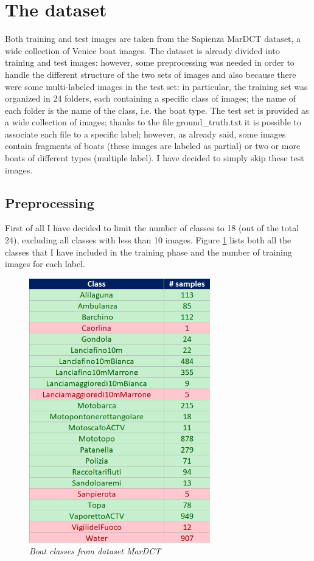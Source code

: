 \documentclass[12pt]{article}
\begin{document}
\section{The dataset}
\label{sec:dataset}
Both training and test images are taken from the Sapienza MarDCT dataset, a wide collection of Venice boat images. The dataset is already divided into training and test images: however, some preprocessing was needed in order to handle the different structure of the two sets of images and also because there were some multi-labeled images in the test set: in particular, the training set was organized in 24 folders, each containing a specific class of images; the name of each folder is the name of the class, i.e. the boat type. The test set is provided as a wide collection of images; thanks to the file ground\_truth.txt it is possible to associate each file to a specific label; however, as already said, some images contain fragments of boats (these images are labeled as partial) or two or more boats of different types (multiple label). I have decided to simply skip these test images.

\subsection{Preprocessing}
\label{sec:preprocessing}
First of all I have decided to limit the number of classes to 18 (out of the total 24), excluding all classes with less than 10 images. Figure \ref{fig:labels} lists both all the classes that I have included in the training phase and the number of training images for each label.

\begin{figure}[!ht]
	\centering %
	\includegraphics[width=0.7\textwidth]{labels.png} %
	\caption{\textit{Boat classes from dataset MarDCT}} %
	\label{fig:labels}
\end{figure}
\end{document}
